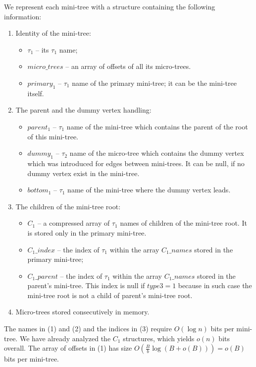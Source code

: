 We represent each mini-tree with a structure containing the following information:
\begin{enumerate}
	\item Identity of the mini-tree:
	\begin{itemize}
		\item $\tau_1$ -- its $\tau_1$ name;
		\item $micro\_trees$ -- an array of offsets of all its micro-trees.
		\item $primary_1$ -- $\tau_1$ name of the primary mini-tree; it can be the mini-tree itself.
	\end{itemize}

	\item The parent and the dummy vertex handling:
	\begin{itemize}
		\item $parent_1$ -- $\tau_1$ name of the mini-tree which contains the parent of the root of this mini-tree.
		\item $dummy_1$ -- $\tau_2$ name of the micro-tree which contains the dummy vertex which was introduced for edges between mini-trees.
		It can be null, if no dummy vertex exist in the mini-tree.
		\item $bottom_1$ -- $\tau_1$ name of the mini-tree where the dummy vertex leads.
	\end{itemize}
	
	\item The children of the mini-tree root:
	\begin{itemize}
		\item $C_1$ -- a compressed array of $\tau_1$ names of children of the mini-tree root.
		It is stored only in the primary mini-tree.
		\item $C_1\_index$ -- the index of $\tau_1$ within the array $C_1\_names$ stored in the primary mini-tree;
		\item $C_1\_parent$ -- the index of $\tau_1$ within the array $C_1\_names$ stored in the parent's mini-tree.
		This index is null if $type3 = 1$ because in such case the mini-tree root is not a child of parent's mini-tree root.
	\end{itemize}
	
	\item Micro-trees stored consecutively in memory.
\end{enumerate}

The names in (1) and (2) and the indices in (3) require $O(\log n)$ bits per mini-tree.
We have already analyzed the $C_1$ structures, which yields $o(n)$ bits overall.
The array of offsets in (1) has size $O\left(\frac{B}{b} \log (B + o(B))\right) = o(B)$ bits per mini-tree.

